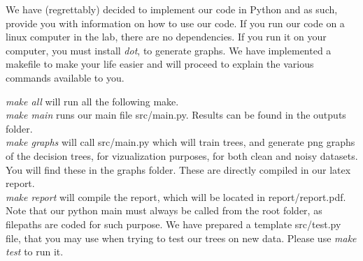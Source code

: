 We have (regrettably) decided to implement our code in Python and as such, provide you with information on how to use our code.
If you run our code on a linux computer in the lab, there are no dependencies. If you run it on your computer, you must install \emph{dot}, to generate graphs.
We have implemented a makefile to make your life easier and will proceed to explain the various commands available to you.

\emph{make all} will run all the following make.\\
\emph{make main} runs our main file src/main.py. Results can be found
in the outputs folder.\\
\emph{make graphs} will call src/main.py which will train trees, and generate png graphs of the decision trees, for vizualization purposes,
for both clean and noisy datasets. You will find these in the graphs folder.
These are directly compiled in our latex report.\\
\emph{make report} will compile the report, which will be located in report/report.pdf.\\


Note that our python main must always be called from the root folder, as filepaths are coded for such purpose.
We have prepared a template src/test.py file, that you may use when
trying to test our trees on new data.
Please use \emph{make test} to run it.




